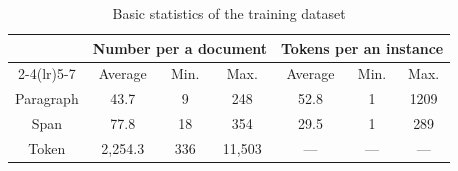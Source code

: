 \begin{table}[t]
    \centering
    \fontsize{8pt}{10pt}\selectfont
    \setlength{\tabcolsep}{4pt}
    \renewcommand{\arraystretch}{.6}
    \begin{tabular}{ccccccc}\toprule
        & \multicolumn{3}{c}{Number per a document} & \multicolumn{3}{c}{Tokens per an instance} \\\cmidrule(lr){2-4}\cmidrule(lr){5-7}
        & Average & Min. & Max. & Average & Min. & Max.\\\midrule
        Paragraph & 43.7 & 9 & 248 & 52.8 & 1 & 1209 \\
        Span & 77.8 & 18 & 354 & 29.5 & 1 & 289 \\
        Token & 2,254.3 & 336 & 11,503 & --- & --- & --- \\\bottomrule
    \end{tabular}
    \caption{Basic statistics of the training dataset}\label{tab:data-tokens}
\end{table}
